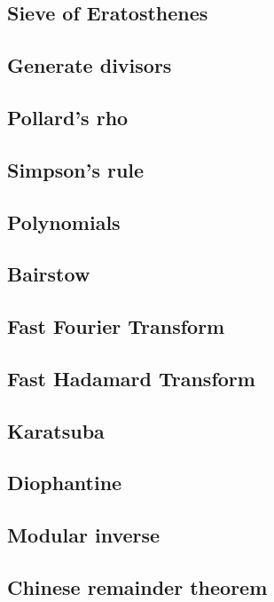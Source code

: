 \subsection{Sieve of Eratosthenes}
\subsection{Generate divisors}
\subsection{Pollard's rho}
\subsection{Simpson's rule}
\subsection{Polynomials}
\subsection{Bairstow}
\subsection{Fast Fourier Transform}
\subsection{Fast Hadamard Transform}
\subsection{Karatsuba}
\subsection{Diophantine}
\subsection{Modular inverse}
\subsection{Chinese remainder theorem}
